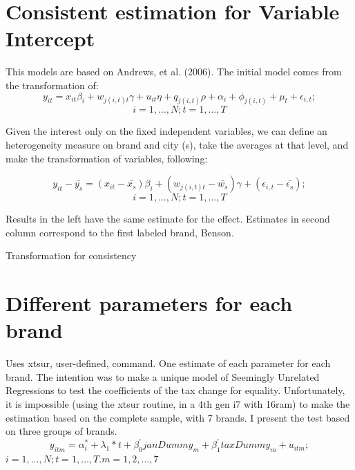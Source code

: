\documentclass[]{article}
\begin{document}
\section{Consistent estimation for Variable Intercept}
This models are based on Andrews, et al. (2006). The initial model comes from the transformation of:
\begin{equation*}
	y_{it} = x_{it} \beta_{i} + w_{j(i,t)t} \gamma + u_{it} \eta + q_{j(i,t)} \rho + \alpha_{i}  + \phi_{j(i,t)} + \mu_{t} + \epsilon_{i,t}; 
\end{equation*}
$$i = 1,\ldots,N; t=1,\ldots,T$$

Given the interest only on the fixed independent variables, we can define an heterogeneity measure on brand and city (s), take the averages at that level, and make the transformation of variables, following:
 
\begin{equation*}
y_{it} - \bar{y_s} = (x_{it} - \bar{x_{s}}) \beta_{i} + (w_{j(i,t)t}-\bar{w_{s}}) \gamma + (\epsilon_{i,t} - \bar{\epsilon_{s}}); 
\end{equation*}
$$i = 1,\ldots,N; t=1,\ldots,T$$
 
Results in the left have the same estimate for the effect. Estimates in second column correspond to the first labeled brand, Benson.
 
	\begin{table}[ht]
		\centering
		\caption{Transformation for consistency \label{tab:xtDm}} 

	\end{table}



\section{Different parameters for each brand}
Uses xtsur, user-defined, command.
One estimate of each parameter for each brand. 
The intention was to make a unique model of Seemingly Unrelated Regressions to test the coefficients of the tax change for equality. 
Unfortunately, it is impossible (using the xtsur routine, in a 4th gen i7 with 16ram) to make the estimation based on the complete sample, with 7 brands. I present the test based on three groups of brands.
\begin{equation*} 
	y_{itm}  = \alpha_{i}^{*} + \lambda_{1}*t +\beta_{0}^{'}janDummy_{m} + \beta_{1}^{'}taxDummy_{m} + u_{itm}
	;  
\end{equation*}
$i  = 1,\ldots,N;  t=1,\ldots,T. m = 1,2,\ldots,7$
\end{document}
